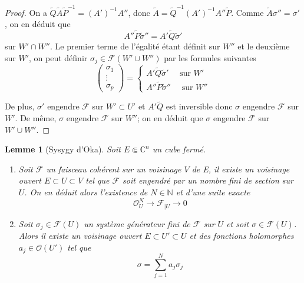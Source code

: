 \documentclass{article}
\newtheorem{lemme}[theoreme]{Lemme}
\theoremstyle{definition}
\theoremstyle{remarque}
\begin{document}
\begin{proof}
On a $\tilde{Q}\tilde{A}\tilde{P}^{-1} = (A')^{-1}A''$, donc $\tilde{A} = \tilde{Q}^{-1}(A')^{-1}A''\tilde{P}$. Comme $\tilde{A}\sigma'' = \sigma'$, on en déduit que $$A''\tilde{P}\tilde{\sigma}''=A'\tilde{Q}\tilde{\sigma}'$$ sur $W' \cap W''$. Le premier terme de l'égalité étant définit sur $W''$ et le deuxième sur $W'$, on peut définir $\sigma_j \in \mathcal{F}(W'\cup W'')$ par les formules suivantes
\begin{equation*}
\begin{pmatrix}
   \sigma_1 \\ \vdots \\ \sigma_p
\end{pmatrix} = \left\{
\begin{array}{l}
  A'\tilde{Q}\tilde{\sigma}' \quad\text{ sur } W'\\
  A''\tilde{P}\tilde{\sigma}'' \quad\text{ sur } W''
\end{array}
\right.
\end{equation*}

De plus, $\sigma'$ engendre $\mathcal{F}$ sur $W' \subset U'$ et $A'\tilde{Q}$ est inversible donc $\sigma$ engendre $\mathcal{F}$ sur $W'$. De même, $\sigma$ engendre $\mathcal{F}$ sur $W''$; on en déduit que $\sigma$ engendre $\mathcal{F}$ sur $W'\cup W''$.
\end{proof}

\begin{lemme}[Sysygy d'Oka]
Soit $E \Subset \mathbb{C}^n$ un cube fermé.
\begin{enumerate}
\item Soit $\mathcal{F}$ un faisceau cohérent sur un voisinage $V$ de E, il existe un voisinage ouvert $E \subset U \subset V$ tel que $\mathcal{F}$ soit engendré par un nombre fini de section sur $U$. On en déduit alors l'existence de $N \in \mathbb{N}$ et d'une suite exacte $$\mathcal{O}^N_U \to \mathcal{F}_{|U} \to 0$$
\item Soit $\sigma_j \in \mathcal{F}(U)$ un système générateur fini de $\mathcal{F}$ sur $U$ et  soit $\sigma \in \mathcal{F}(U)$. Alors il existe un voisinage ouvert $E \subset U' \subset U$ et des fonctions holomorphes $a_j \in \mathcal{O}(U')$ tel que $$\sigma = \sum_{j=1}^N a_j\sigma_j$$
\end{enumerate}
\end{lemme}
\end{document}
